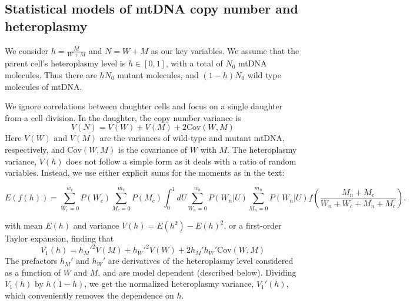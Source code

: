 \documentclass{article}
\begin{document}
\subsection*{Statistical models of mtDNA copy number and heteroplasmy}
We consider $h = \frac{M}{W+M}$ and $N=W+M$ as our key variables. We assume that the parent cell's heteroplasmy level is $h\in [0,1]$, with a total of $N_0$ mtDNA molecules. Thus there are $hN_0$ mutant molecules, and $(1-h)N_0$ wild type molecules of mtDNA. 

We ignore correlations between daughter cells and focus on a single daughter from a cell division. In the daughter, the copy number variance is
\begin{equation}
    V(N) = V(W)+V(M)+2\mathrm{Cov}(W,M)
\end{equation}
Here $V(W)$ and $V(M)$ are the variances of wild-type and mutant mtDNA, respectively, and $\mathrm{Cov}(W,M)$ is the covariance of $W$ with $M$. The heteroplasmy variance, $V(h)$ does not follow a simple form as it deals with a ratio of random variables. Instead, we use either explicit sums for the moments as in the text:

\begin{equation}
    E(f(h)) = \sum_{W_c = 0}^{w_c} P(W_c) \sum_{M_c = 0}^{m_c} P(M_c) \int_0^1 dU \sum_{W_n = 0}^{w_n} P(W_n|U) \sum_{M_n = 0}^{m_n} P(W_n|U) f\left(\frac{M_n+M_c}{W_n+W_c+M_n+M_c}\right).
\end{equation}

with mean $E(h)$ and variance $V(h) = E(h^2) - E(h)^2$, or a first-order Taylor expansion, finding that
\begin{equation}\label{eq:v1h-gen}
V_1(h) = h_M'^2V(M)+h_W'^2V(W)+2h_M'h_W'\mathrm{Cov}(W,M)
\end{equation}
The prefactors $h_M'$ and $h_W'$ are derivatives of the heteroplasmy level considered as a function of $W$ and $M$, and are model dependent (described below). Dividing $V_1(h)$ by $h(1-h)$, we get the normalized heteroplasmy variance, $V_1'(h)$, which conveniently removes the dependence on $h$.
\end{document}

